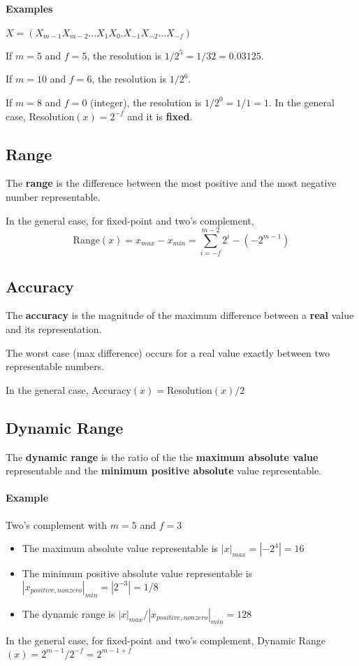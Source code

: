 \documentclass[10pt,a4paper]{book}
\begin{document}
\paragraph{Examples} $X=(X_{m-1}X_{m-2}\ldots X_1X_0.X_{-1}X_{-2}\ldots X_{-f})$\par 
If $m=5$ and $f=5$, the resolution is $1/2^5=1/32=0.03125$.\par 
If $m=10$ and $f=6$, the resolution is $1/2^6$.\par 
If $m=8$ and $f=0$ (integer), the resolution is $1/2^0=1/1=1$.
\medskip
In the general case, Resolution$(x)=2^{-f}$ and it is \textbf{fixed}.

\subsection{Range}
The \textbf{range} is the difference between the most positive and the most negative number representable.\par 
In the general case, for fixed-point and two's complement, 
\[\text{Range}(x)=x_{max}-x_{min}=\sum^{m-2}_{i=-f}2^i-(-2^{m-1})\]

\subsection{Accuracy}
The \textbf{accuracy} is the magnitude of the maximum difference between a \textbf{real} value and its representation.\par 
The worst case (max difference) occurs for a real value exactly between two representable numbers.\par 
In the general case, Accuracy$(x)=$Resolution$(x)/2$

\subsection{Dynamic Range}
The \textbf{dynamic range} is the ratio of the the \textbf{maximum absolute value} representable and the \textbf{minimum positive absolute} value representable.
\paragraph{Example} 
Two's complement with $m=5$ and $f=3$
\begin{itemize}
\item The maximum absolute value representable is $|x|_{max}=|-2^4|=16$
\item The minimum positive absolute value representable is $|x_{positive,nonzero}|_{min}=|2^{-3}|=1/8$
\item The dynamic range is $|x|_{max}/|x_{positive,nonzero}|_{min}=128$
\end{itemize}
In the general case, for fixed-point and two's complement, Dynamic Range$(x)=2^{m-1}/2^{-f}=2^{m-1+f}$
\end{document}
